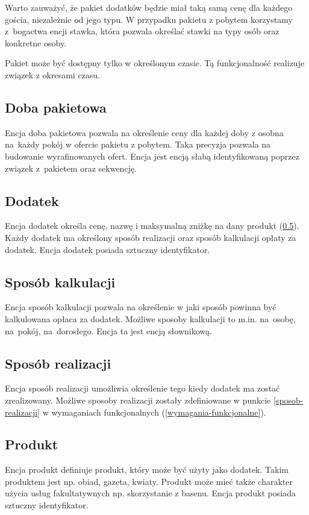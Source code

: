 \documentclass[a4paper,onecolumn,oneside,11pt,wide,floatssmall]{mwrep}
\theoremstyle{definition}
\theoremstyle{plain}%
\theoremstyle{remark}
\begin{document}
Warto zauważyć, że pakiet dodatków będzie miał taką samą cenę dla każdego gościa, niezależnie od jego typu. W przypadku pakietu z pobytem korzystamy \mbox{z bogactwa} encji stawka, która pozwala określać stawki na typy osób oraz konkretne osoby.

Pakiet może być dostępny tylko w określonym czasie. Tą funkcjonalność realizuje związek z okresami czasu.

\subsection{Doba pakietowa}
\label{noc-pakietowa}
Encja doba pakietowa pozwala na określenie ceny dla każdej doby z osobna \mbox{na każdy} pokój w ofercie pakietu z pobytem. Taka precyzja pozwala na budowanie wyrafinowanych ofert. Encja jest encją słabą identyfikowaną poprzez związek \mbox{z pakietem} oraz sekwencję.

\subsection{Dodatek}
Encja dodatek określa cenę, nazwę i maksymalną zniżkę na dany produkt (\ref{model-produkt}). Każdy dodatek ma określony sposób realizacji oraz sposób kalkulacji opłaty za dodatek. Encja dodatek posiada sztuczny identyfikator.

\subsection{Sposób kalkulacji}
Encja sposób kalkulacji pozwala na określenie w jaki sposób powinna być kalkulowana opłaca za dodatek. Możliwe sposoby kalkulacji to m.in. \mbox{na osobę}, \mbox{na pokój}, \mbox{na dorosłego}. Encja ta jest encją słownikową.

\subsection{Sposób realizacji}
Encja sposób realizacji umożliwia określenie tego kiedy dodatek ma zostać zrealizowany. Możliwe sposoby realizacji zostały zdefiniowane w punkcie \ref{sposob-realizacji} w wymaganiach funkcjonalnych (\ref{wymagania-funkcjonalne}).

\subsection{Produkt}
\label{model-produkt}
Encja produkt definiuje produkt, który może być użyty jako dodatek. Takim produktem jest np. obiad, gazeta, kwiaty. Produkt może mieć także charakter użycia usług fakultatywnych np. skorzystanie z basenu. Encja produkt posiada sztuczny identyfikator.
\end{document}
